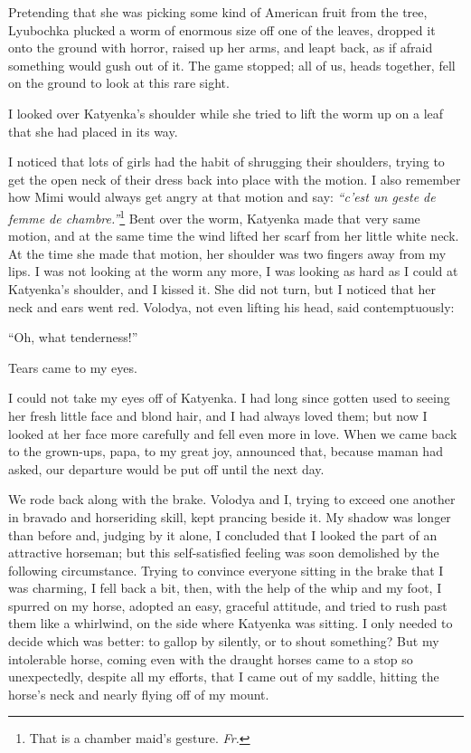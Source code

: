 Pretending that she was picking some kind of American fruit from the tree, Lyubochka plucked a worm of enormous size off one of the leaves, dropped it onto the ground with horror, raised up her arms, and leapt back, as if afraid something would gush out of it. The game stopped; all of us, heads together, fell on the ground to look at this rare sight.

I looked over Katyenka's shoulder while she tried to lift the worm up on a leaf that she had placed in its way.

I noticed that lots of girls had the habit of shrugging their shoulders, trying to get the open neck of their dress back into place with the motion. I also remember how Mimi would always get angry at that motion and say: \textit{``c'est un geste de femme de chambre.''}\footnote{That is a chamber maid's gesture. \textit{Fr.}} Bent over the worm, Katyenka made that very same motion, and at the same time the wind lifted her scarf from her little white neck. At the time she made that motion, her shoulder was two fingers away from my lips. I was not looking at the worm any more, I was looking as hard as I could at Katyenka's shoulder, and I kissed it. She did not turn, but I noticed that her neck and ears went red. Volodya, not even lifting his head, said contemptuously:

``Oh, what tenderness!'' %

Tears came to my eyes.

I could not take my eyes off of Katyenka. I had long since gotten used to seeing her fresh little face and blond hair, and I had always loved them; but now I looked at her face more carefully and fell even more in love. When we came back to the grown-ups, papa, to my great joy, announced that, because maman had asked, our departure would be put off until the next day.

We rode back along with the brake. Volodya and I, trying to exceed one another in bravado and horseriding skill, kept prancing beside it. My shadow was longer than before and, judging by it alone, I concluded that I looked the part of an attractive horseman; but this self-satisfied feeling was soon demolished by the following circumstance. Trying to convince everyone sitting in the brake that I was charming, I fell back a bit, then, with the help of the whip and my foot, I spurred on my horse, adopted an easy, graceful attitude, and tried to rush past them like a whirlwind, on the side where Katyenka was sitting. I only needed to decide which was better: to gallop by silently, or to shout something? But my intolerable horse, coming even with the draught horses came to a stop so unexpectedly, despite all my efforts, that I came out of my saddle, hitting the horse's neck and nearly flying off of my mount.

